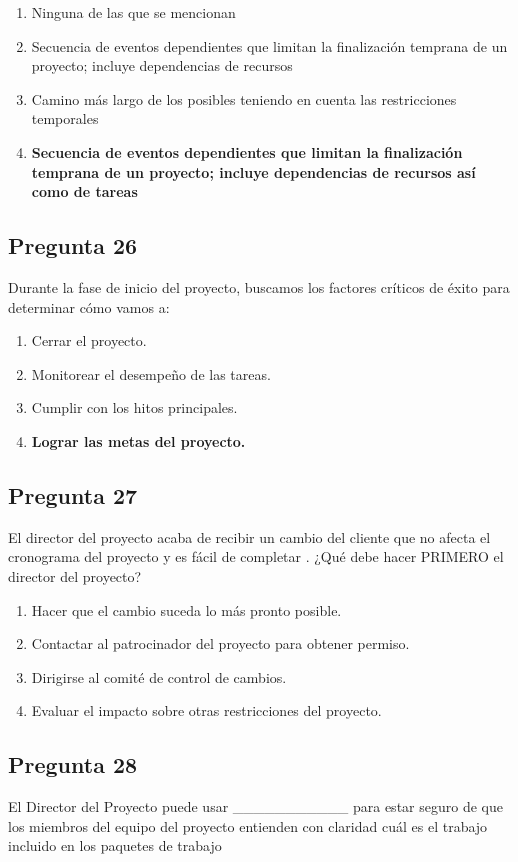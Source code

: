 \documentclass[11pt,a4paper]{article}
\begin{document}
\begin{enumerate}[label=\alph*)]
  \item Ninguna de las que se mencionan
  \item Secuencia de eventos dependientes que limitan la finalización temprana de un proyecto; incluye dependencias de recursos
  \item Camino más largo de los posibles teniendo en cuenta las restricciones temporales
  \item \textbf{Secuencia de eventos dependientes que limitan la finalización temprana de un proyecto; incluye dependencias de recursos así como de tareas}
\end{enumerate}

\subsection*{Pregunta 26}
Durante la fase de inicio del proyecto, buscamos los factores críticos de éxito para determinar cómo vamos a:

\begin{enumerate}[label=\alph*)]
  \item Cerrar el proyecto.
  \item Monitorear el desempeño de las tareas.
  \item Cumplir con los hitos principales.
  \item \textbf{Lograr las metas del proyecto.}
\end{enumerate}

\subsection*{Pregunta 27}
El director del proyecto acaba de recibir un cambio del cliente que no afecta el cronograma del proyecto y es fácil de completar . ¿Qué debe hacer PRIMERO el director del proyecto?

\begin{enumerate}[label=\alph*)]
  \item Hacer que el cambio suceda lo más pronto posible.
  \item Contactar al patrocinador del proyecto para obtener permiso.
  \item Dirigirse al comité de control de cambios.
  \item Evaluar el impacto sobre otras restricciones del proyecto.
\end{enumerate}

\subsection*{Pregunta 28}
El Director del Proyecto puede usar \_\_\_\_\_\_\_\_\_\_\_ para estar seguro de que los miembros del equipo del proyecto entienden con claridad cuál es el trabajo incluido en los paquetes de trabajo
\end{document}
